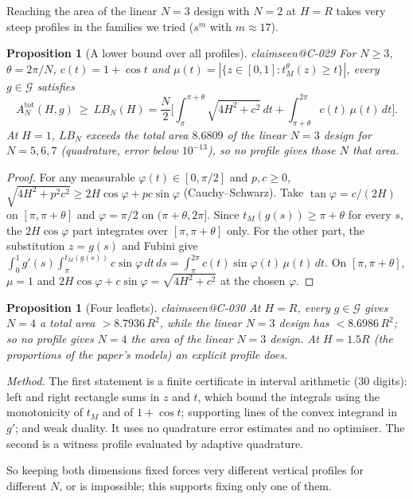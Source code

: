 \documentclass[11pt,a4paper]{article}
\makeatletter
\theoremstyle{plain}
\newtheorem{proposition}[theorem]{Proposition}
\theoremstyle{remark}
\newcommand{\claim}[1]{\ifcsname claimseen@#1\endcsname\else\expandafter\gdef\csname claimseen@#1\endcsname{}\label{claim:#1}\fi}
\makeatother
\begin{document}
Reaching the area of the linear $N=3$ design with $N=2$ at $H=R$ takes very steep profiles in the families we tried
($s^m$ with $m\approx17$).

\begin{proposition}[A lower bound over all profiles]\label{prop:lower}\claim{C-029}
For $N\ge3$, $\theta=2\pi/N$, $c(t)=1+\cos t$ and $\mu(t)=|\{z\in[0,1]: t_M^\theta(z)\ge t\}|$, every $g\in\mathcal G$ satisfies
\[ A^{\mathrm{tot}}_N(H,g)\ \ge\ LB_N(H)=\frac N2\Big[\int_\pi^{\pi+\theta}\!\sqrt{4H^2+c^2}\,dt+\int_{\pi+\theta}^{2\pi}c(t)\,\mu(t)\,dt\Big]. \]
At $H=1$, $LB_N$ exceeds the total area $8.6809$ of the linear $N=3$ design for $N=5,6,7$ (quadrature, error below $10^{-13}$),
so no profile gives those $N$ that area.
\end{proposition}
\begin{proof}
For any measurable $\varphi(t)\in[0,\pi/2]$ and $p,c\ge0$, $\sqrt{4H^2+p^2c^2}\ge2H\cos\varphi+pc\sin\varphi$ (Cauchy--Schwarz).
Take $\tan\varphi=c/(2H)$ on $[\pi,\pi+\theta]$ and $\varphi=\pi/2$ on $(\pi+\theta,2\pi]$. Since $t_M(g(s))\ge\pi+\theta$ for
every $s$, the $2H\cos\varphi$ part integrates over $[\pi,\pi+\theta]$ only. For the other part, the substitution $z=g(s)$ and
Fubini give $\int_0^1g'(s)\int_\pi^{t_M(g(s))}c\sin\varphi\,dt\,ds=\int_\pi^{2\pi}c(t)\sin\varphi(t)\,\mu(t)\,dt$. On
$[\pi,\pi+\theta]$, $\mu=1$ and $2H\cos\varphi+c\sin\varphi=\sqrt{4H^2+c^2}$ at the chosen $\varphi$.
\end{proof}

\begin{proposition}[Four leaflets]\label{prop:four}\claim{C-030}
At $H=R$, every $g\in\mathcal G$ gives $N=4$ a total area $>8.7936\,R^2$, while the linear $N=3$ design has $<8.6986\,R^2$;
so no profile gives $N=4$ the area of the linear $N=3$ design. At $H=1.5R$ (the proportions of the paper's models) an
explicit profile does.
\end{proposition}
\noindent\emph{Method.} The first statement is a finite certificate in interval arithmetic (30 digits): left and right
rectangle sums in $z$ and $t$, which bound the integrals using the monotonicity of $t_M$ and of $1+\cos t$; supporting lines
of the convex integrand in $g'$; and weak duality. It uses no quadrature error estimates and no optimiser. The second is a
witness profile evaluated by adaptive quadrature.

So keeping both dimensions fixed forces very different vertical profiles for different $N$, or is impossible; this
supports fixing only one of them.
\end{document}
